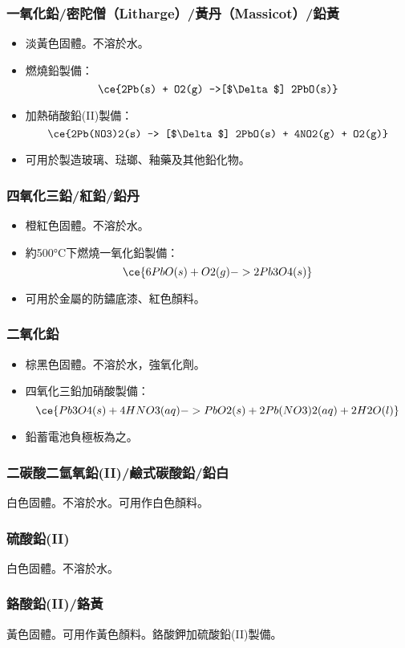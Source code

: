 \documentclass[a4paper,12pt]{report}
\begin{document}
\begin{itemize}
\begin{itemize}
\subsubsection{一氧化鉛/密陀僧（Litharge）/黃丹（Massicot）/鉛黃}
\begin{itemize}
\item 淡黃色固體。不溶於水。
\item 燃燒鉛製備：
\[\ce{2Pb(s) + O2(g) ->[$\Delta$] 2PbO(s)}\]
\item 加熱硝酸鉛(II)製備：
\[\ce{2Pb(NO3)2(s) -> [$\Delta$] 2PbO(s) + 4NO2(g) + O2(g)}\]
\item 可用於製造玻璃、琺瑯、釉藥及其他鉛化物。
\end{itemize}
\subsubsection{四氧化三鉛/紅鉛/鉛丹}
\begin{itemize}
\item 橙紅色固體。不溶於水。
\item 約500°C下燃燒一氧化鉛製備：
\[\ce{6PbO(s) + O2(g) -> 2Pb3O4(s)}\]
\item 可用於金屬的防鏽底漆、紅色顏料。
\end{itemize}
\subsubsection{二氧化鉛}
\begin{itemize}
\item 棕黑色固體。不溶於水，強氧化劑。
\item 四氧化三鉛加硝酸製備：
\[\ce{Pb3O4(s) + 4HNO3(aq) -> PbO2(s) + 2Pb(NO3)2(aq) + 2H2O(l)}\]
\item 鉛蓄電池負極板為之。
\end{itemize}
\subsubsection{二碳酸二氫氧鉛(II)/鹼式碳酸鉛/鉛白}
白色固體。不溶於水。可用作白色顏料。
\subsubsection{硫酸鉛(II)}
白色固體。不溶於水。
\subsubsection{鉻酸鉛(II)/鉻黃}
黃色固體。可用作黃色顏料。鉻酸鉀加硫酸鉛(II)製備。

\end{itemize}
\end{itemize}
\end{document}
